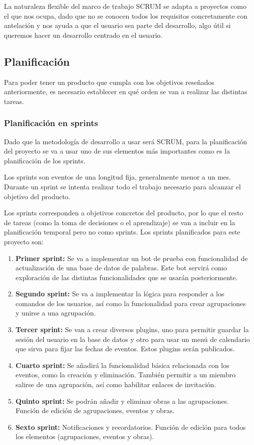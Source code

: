 La naturaleza flexible del marco de trabajo SCRUM se adapta a proyectos como el que nos ocupa, dado que no se conocen todos los requisitos concretamente con antelación y nos ayuda a que el usuario sea parte del desarrollo, algo útil si queremos hacer un desarrollo centrado en el usuario.

\subsection{Planificación}

Para poder tener un producto que cumpla con los objetivos reseñados anteriormente, es necesario establecer en qué orden se van a realizar las distintas tareas.


\subsubsection{Planificación en sprints}

Dado que la metodología de desarrollo a usar será SCRUM, para la planificación del proyecto se va a usar uno de sus elementos más importantes como es la planificación de los sprints. 

Los sprints son eventos de una longitud fija, generalmente menor a un mes. Durante un sprint se intenta realizar todo el trabajo necesario para alcanzar el objetivo del producto.

Los sprints corresponden a objetivos concretos del producto, por lo que el resto de tareas (como la toma de decisiones o el aprendizaje) se van a incluir en la planificación temporal pero no como sprints. Los sprints planificados para este proyecto son:

\begin{enumerate}

\item \textbf{Primer sprint:} Se va a implementar un bot de prueba con funcionalidad de actualización de una base de datos de palabras. Este bot servirá como exploración de las distintas funcionalidades que se usarán posteriormente.
\item \textbf{Segundo sprint:} Se va a implementar la lógica para responder a los comandos de los usuarios, así como la funcionalidad para crear agrupaciones y unirse a una agrupación.
\item \textbf{Tercer sprint:} Se van a crear diversos plugins, uno para permitir guardar la sesión del usuario en la base de datos y otro para usar un menú de calendario que sirva para fijar las fechas de eventos. Estos plugins serán publicados.
\item \textbf{Cuarto sprint:} Se añadirá la funcionalidad básica relacionada con los eventos, como la creación y eliminación. También permitir a un miembro salirse de una agrupación, así como habilitar enlaces de invitación.
\item \textbf{Quinto sprint:} Se podrán añadir y eliminar obras a las agrupaciones. Función de edición de agrupaciones, eventos y obras. 
\item \textbf{Sexto sprint:} Notificaciones y recordatorios. Función de edición para todos los elementos (agrupaciones, eventos y obras).
\end{enumerate}

